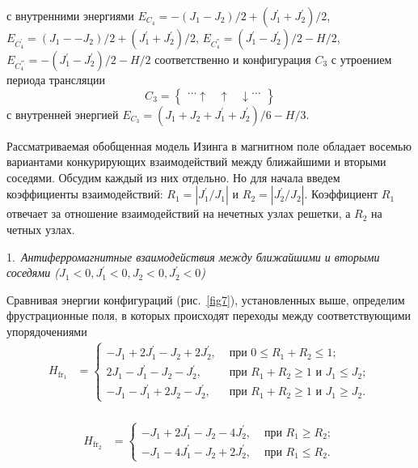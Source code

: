 с внутренними энергиями $E_{C_4} = -(J_1-J_2)/2+(J_{1}^{'}+J_{2}^{'})/2$, $E_{C_4^{'}} = (J_1--J_2)/2+(J_{1}^{'}+J_{2}^{'})/2$, $E_{C_4^{''}} = (J_{1}^{'}-J_{2}^{'})/2-H/2$, $E_{C_4^{'''}} = -(J_{1}^{'}-J_{2}^{'})/2-H/2$ соответственно и конфигурация $C_3$ с утроением периода трансляции
\begin{equation*}
C_3 =
\left\{\!\begin{aligned}
\dots \uparrow\;\;\; \uparrow \;\;\;\downarrow   \dots 
\end{aligned}\right\}
\end{equation*}
с внутренней энергией $E_{C_3} = (J_1+J_2+J_{1}^{'}+J_{2}^{'})/6-H/3$.

Рассматриваемая обобщенная модель Изинга в магнитном поле обладает восемью вариантами конкурирующих взаимодействий между ближайшими и вторыми соседями. Обсудим каждый из них отдельно. Но для начала введем коэффициенты взаимодействий: $R_1 = |J_1^{'} /J_1|$ и $R_2 = |J_2^{'} /J_2|$. Коэффициент $R_1$ отвечает за отношение взаимодействий на нечетных узлах решетки, а $R_2$ на четных узлах.		


1.~\emph{Антиферромагнитные взаимодействия между ближайшими и вторыми соседями ($J_1 < 0, J_1^{'} < 0, J_2 < 0, J_2^{'} < 0$)}

Сравнивая энергии конфигураций (рис.~\ref{fig7}), установленных выше, определим фрустрационные поля, в которых происходят переходы между соответствующими упорядочениями
\[
\begin{aligned}
H_{\text{fr$_1$}}&=
\begin{cases}
-J_1+2J_1^{'}-J_2+2J_2^{'}, & \text{ при }  0\leq R_1+R_2\leq 1; \\
2J_1-J_1^{'}-J_2-J_2^{'},   & \text{ при }  R_1+R_2\ge 1 \text{ и } J_{1}\leq J_{2}; \\
-J_1-J_1^{'}+2J_2-J_2^{'}, & \text{ при }  R_1+R_2\ge 1 \text{ и } J_{1}\ge J_{2}.
\end{cases}\\
\end{aligned}
\]

\[
\begin{aligned}
H_{\text{fr$_2$}}&=
\begin{cases}
-J_1+2J_1^{'}-J_2-4J_2^{'}, & \text{ при }  R_1\ge R_2; \\
-J_1-4J_1^{'}-J_2+2J_2^{'},   & \text{ при }  R_1\leq R_2.
\end{cases}\\
\end{aligned}
\]

